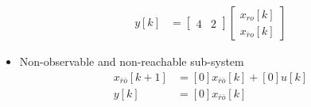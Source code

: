 \documentclass[twoside]{article}
\begin{document}
\begin{itemize}
\begin{align*}
        \\
        y[k] &= \left[ \begin{array}{c|c} 4 & 2 \end{array} \right] \begin{bmatrix} x_{ro}[k] \\ x_{\bar{r}o}[k] \end{bmatrix} 
    \end{align*}
    \item Non-observable and non-reachable sub-system
    \begin{align*}
        x_{\bar{r}\bar{o}}[k+1] &= [0] x_{\bar{r}\bar{o}}[k] + [0] u[k]
        \\
        y[k] &= [0] x_{\bar{r}\bar{o}}[k]
    \end{align*}
\end{itemize}



\end{document}
